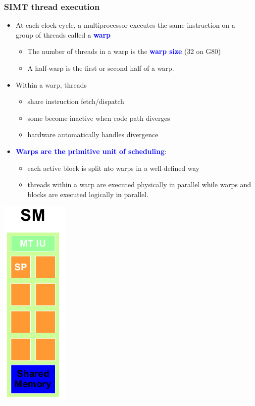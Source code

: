 \begin{frame}[fragile]
\frametitle{SIMT thread execution}

\begin{itemize}
\item  At each clock cycle, a   
      multiprocessor executes the same
     instruction on a group of threads
     called a \textcolor{blue}{\bf warp}
\begin{itemize}
\item  The number of threads in a warp is
      the \textcolor{blue}{\bf warp size} (32 on G80)
\item A half-warp is the first or second
      half of a warp.
\end{itemize}
\item  Within a warp, threads
\begin{itemize}
\item  share instruction fetch/dispatch
\item  some become inactive when code path diverges
\item  hardware automatically handles divergence
\end{itemize}
\item   \textcolor{blue}{\bf  Warps are the primitive unit of scheduling}:
\begin{itemize}
\item each active block is split nto warps in a well-defined way
\item threads within a warp are executed physically in
      parallel while warps and blocks are executed logically in
      parallel.
\end{itemize}
\end{itemize}

\begin{center}
\includegraphics[scale=0.25]{images/39.png}
\end{center}
\end{frame}
